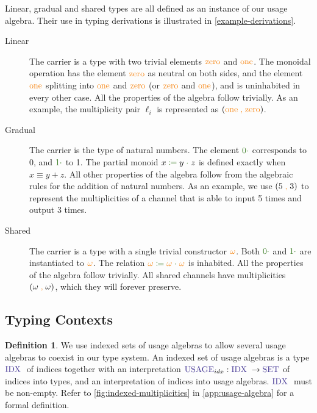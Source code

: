 \documentclass[a4paper,UKenglish,cleveref,autoref,thm-restate,authorcolumns]{lipics-v2019}
\theoremstyle{definition}
\newtheorem{nidefinition}[theorem]{Definition}
\newcommand{\type}[1]{\textcolor{BlueViolet}{\operatorname{#1}}}
\newcommand{\constr}[1]{\textcolor{BurntOrange}{\operatorname{#1}}}
\newcommand{\func}[1]{\textcolor{OliveGreen}{\operatorname{#1}}}
\newcommand{\comma}{\; \constr{,} \;}
\newcommand{\op}[3]{#1 \; \func{\coloneqq} \; #2 \; \func{\cdot} \; #3}
\newcommand{\zero}{\func{0\cdot}}
\newcommand{\one}{\func{1\cdot}}
\newcommand{\Set}{\type{SET}}
\newcommand{\Idx}{\type{IDX}\;}
\newcommand{\Usage}{\type{USAGE}}
\begin{document}
Linear, gradual and shared types are all defined as an instance of our usage algebra.
Their use in typing derivations is illustrated in \autoref{example-derivations}.
\begin{description}
  \item [Linear]
    The carrier is a type with two trivial elements $\constr{zero}$ and $\constr{one}$.
    The monoidal operation has the element $\constr{zero}$ as neutral on both sides, and the element $\constr{one}$ splitting into $\constr{one}$ and $\constr{zero}$ (or $\constr{zero}$ and $\constr{one}$), and is uninhabited in every other case.
    All the properties of the algebra follow trivially.
    As an example, the multiplicity pair $\ell_i$ is represented as $(\constr{one} \comma \constr{zero})$.

    \item [Gradual]
    The carrier is the type of natural numbers.
    The element $\zero$ corresponds to 0, and $\one$ to 1.
    The partial monoid $\op{x}{y}{z}$ is defined exactly when $x \equiv y + z$.
    All other properties of the algebra follow from the algebraic rules for the addition of natural numbers.
    As an example, we use $(5 \comma 3)$ to represent the multiplicities of a channel that is able to input 5 times and output 3 times.

    \item [Shared]
    The carrier is a type with a single trivial constructor $\constr{\omega}$.
    Both $\zero$ and $\one$ are instantiated to $\constr{\omega}$.
    The relation $\op{\constr{\omega}}{\constr{\omega}}{\constr{\omega}}$ is inhabited.
    All the properties of the algebra follow trivially.
    All shared channels have multiplicities $(\omega \comma \omega)$, which they will forever preserve.
\end{description}

\subsection{Typing Contexts}
\label{contexts}


\begin{nidefinition}
  We use indexed sets of usage algebras to allow several usage algebras to coexist in our type system.
  An indexed set of usage algebras is a type $\Idx$ of indices together with an interpretation $\Usage_{idx} : \Idx \to \Set$ of indices into types, and an interpretation of indices into usage algebras.
  $\Idx$ must be non-empty.
  Refer to \autoref{fig:indexed-multiplicities} in \autoref{app:usage-algebra} for a formal definition.
\end{nidefinition}
\end{document}
